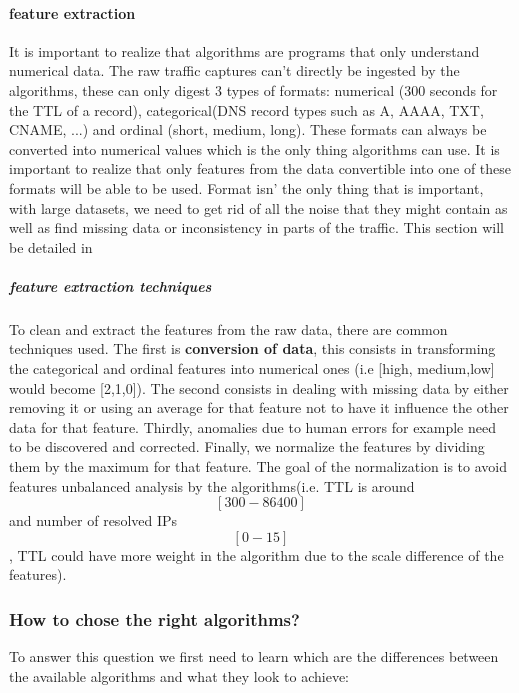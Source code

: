 \paragraph{feature extraction} It is important to realize that algorithms are programs that only understand numerical data. The raw traffic captures can't directly be ingested by the algorithms, these can only digest 3 types of formats: numerical (300 seconds for the TTL of a record), categorical(DNS record types such as A, AAAA, TXT, CNAME, ...) and ordinal (short, medium, long). These formats can always be converted into numerical values which is the only thing algorithms can use. It is important to realize that only features from the data convertible into one of these formats will be able to be used. Format isn' the only thing that is important, with large datasets, we need to get rid of all the noise that they might contain as well as find missing data or inconsistency in parts of the traffic.
This section will be detailed in \label{featureextractionlabel}

\subparagraph{feature extraction techniques} To clean and extract the features from the raw data, there are common techniques used. The first is \textbf{conversion of data}, this consists in transforming the categorical and ordinal features into numerical ones (i.e [high, medium,low] would become [2,1,0]). The second consists in dealing with missing data by either removing it or using an average for that feature not to have it influence the other data for that feature. Thirdly, anomalies due to human errors for example need to be discovered and corrected. Finally, we normalize the features\cite{ml-norm} by dividing them by the maximum for that feature. The goal of the normalization is to avoid features unbalanced analysis by the algorithms(i.e. TTL is around $$[300-86400]$$ and number of resolved IPs $$[0-15]$$, TTL could have more weight in the algorithm due to the scale difference of the features). 

\subsubsection{How to chose the right algorithms?}
To answer this question we first need to learn which are the differences between the available algorithms and what they look to achieve: 

